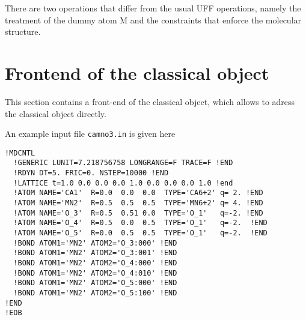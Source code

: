 \documentclass[11pt,a4paper]{report}
\begin{document}
There are two operations that differ from the usual UFF operations,
namely the treatment of the dummy atom M and the constraints that
enforce the molecular structure.


\appendix
\chapter{Frontend of the classical object}
\label{sec:frontend}
This section contains a front-end of the classical object, which
allows to adress the classical object directly.


An example input file \verb|camno3.in| is given here
\begin{verbatim} 
!MDCNTL
  !GENERIC LUNIT=7.218756758 LONGRANGE=F TRACE=F !END
  !RDYN DT=5. FRIC=0. NSTEP=10000 !END
  !LATTICE t=1.0 0.0 0.0 0.0 1.0 0.0 0.0 0.0 1.0 !end
  !ATOM NAME='CA1'  R=0.0  0.0  0.0  TYPE='CA6+2' q= 2. !END
  !ATOM NAME='MN2'  R=0.5  0.5  0.5  TYPE='MN6+2' q= 4. !END
  !ATOM NAME='O_3'  R=0.5  0.51 0.0  TYPE='O_1'   q=-2. !END
  !ATOM NAME='O_4'  R=0.5  0.0  0.5  TYPE='O_1'   q=-2.  !END
  !ATOM NAME='O_5'  R=0.0  0.5  0.5  TYPE='O_1'   q=-2.  !END
  !BOND ATOM1='MN2' ATOM2='O_3:000' !END
  !BOND ATOM1='MN2' ATOM2='O_3:001' !END
  !BOND ATOM1='MN2' ATOM2='O_4:000' !END
  !BOND ATOM1='MN2' ATOM2='O_4:010' !END
  !BOND ATOM1='MN2' ATOM2='O_5:000' !END
  !BOND ATOM1='MN2' ATOM2='O_5:100' !END
!END
!EOB
\end{verbatim}
\end{document}
